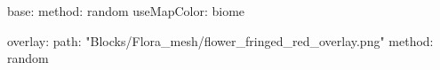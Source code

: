 base:
  method: random
  useMapColor: biome
  
overlay:
  path: "Blocks/Flora_mesh/flower_fringed_red_overlay.png"
  method: random